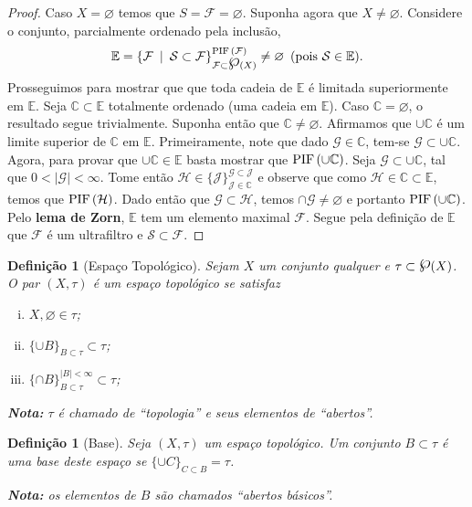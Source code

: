 \documentclass{article}
\newtheorem{definition}[theorem]{Definição}
\newcommand{\powerset}{\raisebox{.15\baselineskip}{\Large\ensuremath{\wp}}}
\newcommand{\suchthat}{\enspace|\enspace}
\newcommand{\fip}[1]{\text{PIF\,}(#1)}
\begin{document}
\begin{proof}
  Caso \(X = \varnothing\) temos que \(S = \mathcal{F} =
  \varnothing\).  Suponha agora que \(X \neq \varnothing\).  Considere
  o conjunto, parcialmente ordenado pela
  inclusão, \[\mathbb{E}=\{\mathcal{F} \suchthat \mathcal{S} \subset
  \mathcal{F}\}_{\mathcal{F}\subset\powerset(X)}^{\fip{\mathcal{F}}}\neq\varnothing\enspace\text{(pois
    \(\mathcal{S}\in\mathbb{E}\))}.\] Prosseguimos para mostrar que
  que toda cadeia de \(\mathbb{E}\) é limitada superiormente em
  \(\mathbb{E}\).  Seja \(\mathbb{C} \subset \mathbb{E}\) totalmente
  ordenado (uma cadeia em \(\mathbb{E}\)).  Caso
  \(\mathbb{C}=\varnothing\), o resultado segue trivialmente.  Suponha
  então que \(\mathbb{C}\neq\varnothing\).  Afirmamos que
  \(\cup\mathbb{C}\) é um limite superior de \(\mathbb{C}\) em
  \(\mathbb{E}\).  Primeiramente, note que dado
  \(\mathcal{G}\in\mathbb{C}\), tem-se
  \(\mathcal{G}\subset\cup\mathbb{C}\).  Agora, para provar que
  \(\cup\mathbb{C}\in\mathbb{E}\) basta mostrar que
  \(\fip{\cup\mathbb{C}}\). Seja \(\mathcal{G} \subset
  \cup\mathbb{C}\), tal que \(0<|\mathcal{G}|<\infty\).  Tome então
  \(\mathcal{H}\in\{\mathcal{J}\}_{\mathcal{J}\in\mathbb{C}}^{\mathcal{G}\subset\mathcal{J}}\)
  e observe que como \(\mathcal{H}\in\mathbb{C}\subset\mathbb{E}\),
  temos que \(\fip{\mathcal{H}}\).  Dado então que
  \(\mathcal{G}\subset\mathcal{H}\), temos
  \(\cap\mathcal{G}\neq\varnothing\) e portanto
  \(\fip{\cup\mathbb{C}}\).  Pelo \textbf{lema de Zorn},
  \(\mathbb{E}\) tem um elemento maximal \(\mathcal{F}\).  Segue pela
  definição de \(\mathbb{E}\) que \(\mathcal{F}\) é um ultrafiltro e
  \(\mathcal{S} \subset \mathcal{F}\).
\end{proof}

\begin{definition}[Espaço Topológico]
  Sejam \(X\) um conjunto qualquer e \(\tau \subset \powerset(X)\).  O
  par \((X,\tau)\) é um espaço topológico se satisfaz
  \begin{enumerate}[(i)]
    \item \(X,\varnothing \in \tau\);
    \item \(\{\cup B\}_{B\subset\tau} \subset \tau\);
    \item \(\{\cap B\}_{B\subset\tau}^{|B| < \infty} \subset \tau\);
  \end{enumerate}
  \textbf{Nota:} \(\tau\) é chamado de ``topologia'' e seus elementos
  de ``abertos''.
\end{definition}

\begin{definition}[Base]
  Seja \((X,\tau)\) um espaço topológico.  Um conjunto
  \(B\subset\tau\) é uma base deste espaço se \(\{\cup C\}_{C\subset
    B}=\tau\).

  \vspace{0.5em}\noindent\textbf{Nota:} os elementos de \(B\) são
  chamados ``abertos básicos''.
\end{definition}
\end{document}
